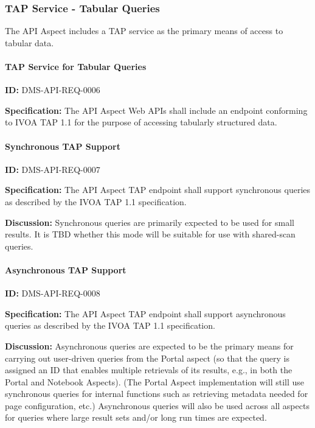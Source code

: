 \documentclass[SE,toc]{lsstdoc}
\begin{document}
\subsubsection{TAP Service - Tabular Queries}

The API Aspect includes a TAP service as the primary means of access to tabular data.

\paragraph{TAP Service for Tabular Queries}\hfill  %

\label{DMS-API-REQ-0006}
\textbf{ID:} DMS-API-REQ-0006

\textbf{Specification:}
The API Aspect Web APIs shall include an endpoint conforming to IVOA TAP 1.1 for the purpose of accessing tabularly structured data.

\paragraph{Synchronous TAP Support}\hfill  %

\label{DMS-API-REQ-0007}
\textbf{ID:} DMS-API-REQ-0007

\textbf{Specification:}
The API Aspect TAP endpoint shall support synchronous queries as described by the IVOA TAP 1.1 specification.

\textbf{Discussion:}
Synchronous queries are primarily expected to be used for small results.  It is TBD whether this mode will be suitable for use with shared-scan queries.

\paragraph{Asynchronous TAP Support}\hfill  %

\label{DMS-API-REQ-0008}
\textbf{ID:} DMS-API-REQ-0008

\textbf{Specification:}
The API Aspect TAP endpoint shall support asynchronous queries as described by the IVOA TAP 1.1 specification.

\textbf{Discussion:}
Asynchronous queries are expected to be the primary means for carrying out user-driven queries from the Portal aspect (so that the query is assigned an ID that enables multiple retrievals of its results, e.g., in both the Portal and Notebook Aspects). (The Portal Aspect implementation will still use synchronous queries for internal functions such as retrieving metadata needed for page configuration, etc.) Asynchronous queries will also be used across all aspects for queries where large result sets and/or long run times are expected.
\end{document}
